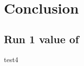 
\chapter{Conclusion}
\label{chapter:Conclusion}
\thispagestyle{myheadings} %

\section{Run 1 value of \amu}
\label{sec:FinalValue}

test4


\cleardoublepage

